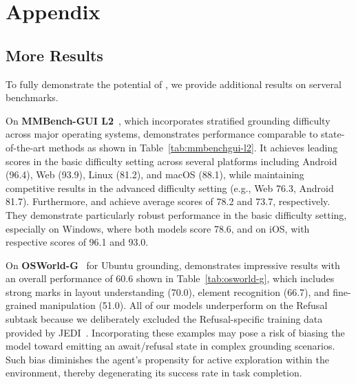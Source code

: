 \appendix
{}


\section{Appendix}
\label{sec:appendix}

\subsection{More Results}
\label{sec:more_results}





To fully demonstrate the potential of \modelname, we provide additional results on serveral benchmarks.

On \textbf{MMBench-GUI L2}~\citep{wang2025mmbenchgui}, which incorporates stratified grounding difficulty across major operating systems,  demonstrates performance comparable to state-of-the-art methods as shown in Table~\ref{tab:mmbenchgui-l2}. It achieves leading scores in the basic difficulty setting across several platforms including Android (96.4), Web (93.9), Linux (81.2), and macOS (88.1), while maintaining competitive results in the advanced difficulty setting (e.g., Web 76.3, Android 81.7). Furthermore,  and  achieve average scores of 78.2 and 73.7, respectively. They demonstrate particularly robust performance in the basic difficulty setting, especially on Windows, where both models score 78.6, and on iOS, with respective scores of 96.1 and 93.0.

On \textbf{OSWorld-G}~\citep{xie2025scalingcomputerusegroundinguser} for Ubuntu grounding,  demonstrates impressive results with an overall performance of 60.6 shown in Table~\ref{tab:osworld-g},  which includes strong marks in layout understanding (70.0), element recognition (66.7), and fine-grained manipulation (51.0). All of our models underperform on the Refusal subtask because we deliberately excluded the Refusal-specific training data provided by JEDI~\citep{xie2025scalingcomputerusegroundinguser}. Incorporating these examples may pose a risk of biasing the model toward emitting an await/refusal state in complex grounding scenarios. Such bias diminishes the agent’s propensity for active exploration within the environment, thereby degenerating its success rate in task completion.

